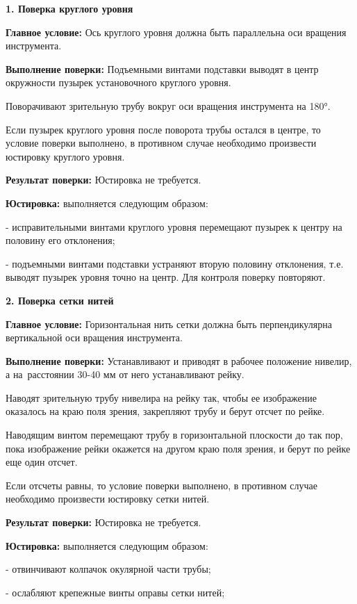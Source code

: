 \documentclass[a4paper]{article}
\begin{document}
\large{
\par\textbf{1. Поверка круглого уровня}
\par \textbf{Главное условие:} Ось круглого уровня должна быть параллельна оси вращения инструмента.
\par \textbf{Выполнение поверки:} Подъемными винтами подставки выводят в центр окружности пузырек установочного круглого уровня.
\par Поворачивают зрительную трубу вокруг оси вращения инструмента на 180°.
\par Если пузырек круглого уровня после поворота трубы остался в центре, то условие поверки выполнено, в противном случае необходимо произвести юстировку круглого уровня.
\par \textbf{Результат поверки:} Юстировка не требуется.
\par \textbf{Юстировка:} выполняется следующим образом:
\par - исправительными винтами круглого уровня перемещают пузырек к центру на половину его отклонения;
\par - подъемными винтами подставки устраняют вторую половину отклонения, т.е. выводят пузырек уровня точно на центр.
Для контроля поверку повторяют.
\par\textbf{2. Поверка сетки нитей}
\par \textbf{Главное условие:} Горизонтальная нить сетки должна быть перпендикулярна вертикальной оси вращения инструмента.
\par \textbf{Выполнение поверки:} Устанавливают и приводят в рабочее положение нивелир, а на расстоянии 30-40 мм от него устанавливают рейку.
\par Наводят зрительную трубу нивелира на рейку так, чтобы ее изображение оказалось на краю поля зрения, закрепляют трубу и берут отсчет по рейке.
\par Наводящим винтом перемещают трубу в горизонтальной плоскости до так пор, пока изображение рейки окажется на другом краю поля зрения, и берут по рейке еще один отсчет.
\par Если отсчеты равны, то условие поверки выполнено, в противном случае необходимо произвести юстировку сетки нитей.
\par \textbf{Результат поверки:} Юстировка не требуется.
\par \textbf{Юстировка:} выполняется следующим образом:
\par - отвинчивают колпачок окулярной части трубы;
\par - ослабляют крепежные винты оправы сетки нитей;
}
\end{document}

